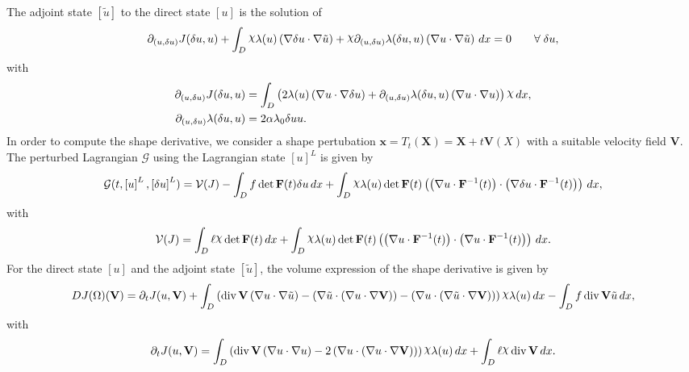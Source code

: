 \documentclass[preview]{standalone}
\let\oldcdot\cdot
\let\cdot\oldcdot
\begin{document}
The adjoint state $\left[ \tilde u\right]$ to the direct state $\left[ u\right]$ is the solution of
\begin{dmath*}
\partial_{(u,\delta u)} J(\delta u,u) +  \int_{D} \raisebox{\depth}{$\chi$} \lambda(u) \left(  \nabla \delta u  \cdot  \nabla \tilde u  \right) + \raisebox{\depth}{$\chi$} \partial_{(u,\delta u)} \lambda(\delta u,u) \left(  \nabla u  \cdot  \nabla \tilde u  \right) \,dx = 0\qquad \forall\; \delta u , 
\end{dmath*}
with 
\begin{align*}
\partial_{(u,\delta u)} J(\delta u,u) &=  \int_{D} \left(2 \lambda(u) \left(  \nabla u  \cdot  \nabla \delta u  \right) + \partial_{(u,\delta u)} \lambda(\delta u,u) \left(  \nabla u  \cdot  \nabla u  \right)\right) \raisebox{\depth}{$\chi$} \,dx,\\
\partial_{(u,\delta u)} \lambda(\delta u,u) &= 2 \alpha \lambda_{0} \delta u u.
 \end{align*}
In order to compute the shape derivative, we consider a shape pertubation $\mathbf x = T_t(\mathbf X) = \mathbf X + t \mathbf  V(X)$ with a suitable velocity field $\mathbf V$. The perturbed Lagrangian $\mathcal G$ using the Lagrangian state $\left[ u\right]^{L}$ is given by
\begin{dmath*}
\mathcal G(t,\left[ u\right]^{L},\left[ \delta u\right]^{L}) = \mathcal V(J) -  \int_{D} f  \operatorname{det}\mathbf F( t )  \delta u \,dx +  \int_{D} \raisebox{\depth}{$\chi$} \lambda(u)  \operatorname{det}\mathbf F( t )  \left( \left(  \nabla u  \cdot  \mathbf F^{-1}(t) \right) \cdot \left(  \nabla \delta u  \cdot  \mathbf F^{-1}(t) \right) \right) \,dx , 
\end{dmath*}
with
\begin{dmath*}
\mathcal V(J) =  \int_{D} \ell \raisebox{\depth}{$\chi$}  \operatorname{det}\mathbf F( t )  \,dx +  \int_{D} \raisebox{\depth}{$\chi$} \lambda(u)  \operatorname{det}\mathbf F( t )  \left( \left(  \nabla u  \cdot  \mathbf F^{-1}(t) \right) \cdot \left(  \nabla u  \cdot  \mathbf F^{-1}(t) \right) \right) \,dx.
 \end{dmath*}
For the direct state $\left[ u\right]$ and the adjoint state $\left[ \tilde u\right]$, the volume expression of the shape derivative is given by
\begin{dmath*}
DJ(\Omega)(\mathbf V) = \partial_{t} J(u,{\mathbf V}) +  \int_{D} \left(\operatorname{div} {\mathbf V} \left(  \nabla u  \cdot  \nabla \tilde u  \right) - \left(  \nabla \tilde u  \cdot \left(  \nabla u  \cdot  \nabla {\mathbf V}  \right) \right) - \left(  \nabla u  \cdot \left(  \nabla \tilde u  \cdot  \nabla {\mathbf V}  \right) \right)\right) \raisebox{\depth}{$\chi$} \lambda(u) \,dx -  \int_{D} f \operatorname{div} {\mathbf V} \tilde u \,dx , 
\end{dmath*}
with
\begin{dmath*}
\partial_{t} J(u,{\mathbf V}) =  \int_{D} \left(\operatorname{div} {\mathbf V} \left(  \nabla u  \cdot  \nabla u  \right) - 2 \left(  \nabla u  \cdot \left(  \nabla u  \cdot  \nabla {\mathbf V}  \right) \right)\right) \raisebox{\depth}{$\chi$} \lambda(u) \,dx +  \int_{D} \ell \raisebox{\depth}{$\chi$} \operatorname{div} {\mathbf V} \,dx.
 \end{dmath*}
\end{document}
